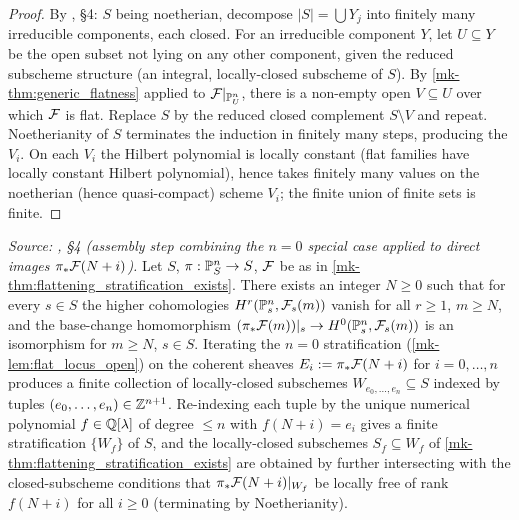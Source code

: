 \begin{proof}
  By \cite{nitsure-hilbert-quot}, \S4: \(S\) being noetherian, decompose \(|S| = \bigcup Y_j\) into
  finitely many irreducible components, each closed.  For an irreducible
  component \(Y\), let \(U \subseteq Y\) be the open subset not lying on any other
  component, given the reduced subscheme structure (an integral, locally-closed
  subscheme of \(S\)).  By \ref{mk-thm:generic_flatness} applied to
  \(\mathcal{F}|_{\mathbb{P}^n_U}\), there is a non-empty open \(V \subseteq U\) over which \(\mathcal{F}\) is
  flat.  Replace \(S\) by the reduced closed complement \(S \setminus V\) and
  repeat. Noetherianity of \(S\) terminates the induction in finitely many
  steps, producing the \(V_i\).  On each \(V_i\) the Hilbert polynomial is locally
  constant (flat families have locally constant Hilbert polynomial), hence
  takes finitely many values on the noetherian (hence quasi-compact) scheme
  \(V_i\); the finite union of finite sets is finite.
\end{proof}

\begin{lemma}
  \label{mk-lem:noetherian_induction_strata}
  \textit{Source: \cite{nitsure-hilbert-quot}, \S4 (assembly step combining the \(n=0\) special case
  applied to direct images \(\pi_*\mathcal{F}(N+i)\)).}
  Let \(S\), \(\pi : \mathbb{P}^n_S \to S\), \(\mathcal{F}\) be as in
  \ref{mk-thm:flattening_stratification_exists}.  There exists an integer
  \(N \ge 0\) such that for every \(s \in S\) the higher cohomologies
  \(H^r(\mathbb{P}^n_s, \mathcal{F}_s(m))\) vanish for all \(r \ge 1\), \(m \ge N\), and the base-change
  homomorphism \((\pi_* \mathcal{F}(m))|_s \to H^0(\mathbb{P}^n_s, \mathcal{F}_s(m))\) is an isomorphism
  for \(m \ge N\), \(s \in S\).  Iterating the \(n=0\) stratification
  (\ref{mk-lem:flat_locus_open}) on the coherent sheaves \(E_i := \pi_* \mathcal{F}(N+i)\)
  for \(i = 0, \dots, n\) produces a finite collection of locally-closed
  subschemes \(W_{e_0, \dots, e_n} \subseteq S\) indexed by tuples
  \((e_0, \dots, e_n) \in \mathbb{Z}^{n+1}\). Re-indexing each tuple by the unique
  numerical polynomial \(f \in \mathbb{Q}[\lambda]\) of degree \(\le n\) with
  \(f(N+i) = e_i\) gives a finite stratification \(\{W_f\}\) of \(S\), and the
  locally-closed subschemes \(S_f \subseteq W_f\) of
  \ref{mk-thm:flattening_stratification_exists} are obtained by further
  intersecting with the closed-subscheme conditions that
  \(\pi_* \mathcal{F}(N+i)|_{W_f}\) be locally free of rank \(f(N+i)\) for all \(i \ge 0\)
  (terminating by Noetherianity).
\end{lemma}

